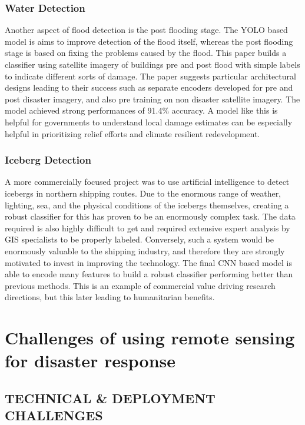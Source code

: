 \documentclass[conference,a4paper]{IEEEtran}
\begin{document}
\subsubsection{Water Detection}

Another aspect of flood detection is the post flooding stage. The YOLO based model is aims to improve detection of the flood itself, whereas the post flooding stage is based on fixing the problems caused by the flood. This paper builds a classifier using satellite imagery of buildings pre and post flood with simple labels to indicate different sorts of damage.  The paper suggests particular architectural designs leading to their success such as separate encoders developed for pre and post disaster imagery, and also pre training on non disaster satellite imagery. The model achieved strong performances of 91.4\% accuracy.  A model like this is helpful for governments to understand local damage estimates can be especially helpful in prioritizing relief efforts and climate resilient redevelopment.

\subsubsection{Iceberg Detection}

A more commercially focused project was to use artificial intelligence to detect icebergs in northern shipping routes.  Due to the enormous range of weather, lighting, sea,  and the physical conditions of the icebergs themselves, creating a robust classifier for this has proven to be an enormously complex task. The data required is also highly difficult to get and required extensive expert analysis by GIS specialists to be properly labeled. Conversely, such a system would be enormously valuable to the shipping industry, and therefore they are strongly motivated to invest in improving the technology. The final CNN based model is able to encode many features to build a robust classifier performing better than previous methods. This is an example of commercial value driving research directions, but this later leading to humanitarian benefits.


\section{Challenges of using remote sensing for disaster response}


\subsection{TECHNICAL \& DEPLOYMENT CHALLENGES}
\end{document}
